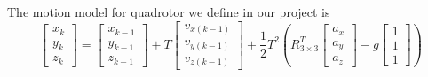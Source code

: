 \documentclass{cisXXX} %
\begin{document}
\maketitle
The motion model for quadrotor we define in our project is 
\begin{equation}
\begin{bmatrix}
x_k \\
y_k \\
z_k
\end{bmatrix}=\begin{bmatrix}
x_{k-1} \\
y_{k-1} \\
z_{k-1}
\end{bmatrix}+T\begin{bmatrix}
v_{x(k-1)} \\
v_{y(k-1)} \\
v_{z(k-1)} 
\end{bmatrix}+\frac{1}{2}T^2\left(R^T_{3\times3}\begin{bmatrix}
a_x   \\
a_y   \\
a_z
\end{bmatrix}-g\begin{bmatrix}
1  \\
1  \\
1
\end{bmatrix}\right)
\end{equation}
\end{document}
